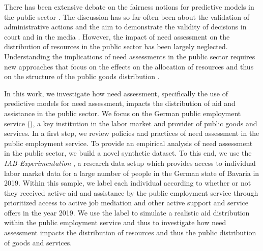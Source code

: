 There has been extensive debate on the fairness notions for predictive models in the public sector \cite{barocas-hardt-narayanan,perdomo2023difficult}. The discussion has so far often been about the validation of administrative actions and the aim to demonstrate the validity of decisions in court and in the media \cite{Bach_Kern_Mautner_Kreuter_2023,desireUsingArtificialIntelligence2021, wang2024}. However, the impact of need assessment on the distribution of resources in the public sector has been largely neglected. Understanding the implications of need assessments in the public sector requires new approaches that focus on the effects on the allocation of resources and thus on the structure of the public goods distribution \cite{kleinberg2015prediction}.

In this work, we investigate how need assessment, specifically the use of predictive models for need assessment, impacts the distribution of aid and assistance in the public sector. We focus on the German public employment service (\pshg), a key institution in the labor market and provider of public goods and services. In a first step, we review policies and practices of need assessment in the public employment service. To provide an empirical analysis of need assessment in the public sector, we build a novel synthetic dataset. To this end, we use the \emph{IAB-Experimentation} \cite{10.1145/3588001.3609369}, a research data setup which provides access to individual labor market data for a large number of people in the German state of Bavaria in 2019. Within this sample, we label each individual according to whether or not they received active aid and assistance by the public employment service through prioritized access to active job mediation and other active support and service offers in the year 2019. We use the label to simulate a realistic aid distribution within the public employment service and thus to investigate how need assessment impacts the distribution of resources and thus the public distribution of goods and services. 


